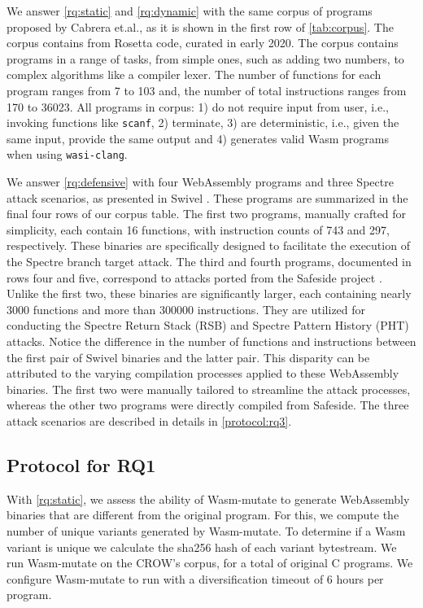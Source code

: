 \documentclass[sigplan,screen]{acmart}
\newcommand{\tool}{Wasm-mutate\xspace}
\newcommand{\wasm}{Wasm\xspace}
\newcommand{\Wasm}{WebAssembly\xspace}
\newcommand{\etal}{et.al.\xspace}
\newcommand{\ie}{i.e.,\xspace}
\begin{document}
We answer \ref{rq:static} and \ref{rq:dynamic} with the same corpus of programs proposed by Cabrera \etal \cite{arteaga2020crow}, as it is shown in the first row of \autoref{tab:corpus}.
The corpus contains \nProgramsRosetta from Rosetta code, curated in early 2020.
The corpus contains programs in a range of tasks, from simple ones, such as adding two numbers, to complex algorithms like a compiler lexer. 
The number of functions for each program ranges from 7 to 103 and, the number of total instructions ranges from 170 to 36023.
All programs in corpus: 1) do not require input from user, \ie invoking functions like \texttt{scanf}, 2) terminate, 3) are deterministic, \ie given the same input, provide the same output and 4) generates valid \wasm programs when using \texttt{wasi-clang}.

We answer \ref{rq:defensive} with four \Wasm programs and three Spectre attack scenarios, as presented in Swivel \cite{Swivel}. 
These programs are summarized in the final four rows of our corpus table.
The first two programs, manually crafted for simplicity, each contain 16 functions, with instruction counts of 743 and 297, respectively. These binaries are specifically designed to facilitate the execution of the Spectre branch target attack.
The third and fourth programs, documented in rows four and five, correspond to attacks ported from the Safeside project \cite{safeside}. 
Unlike the first two, these binaries are significantly larger, each containing nearly 3000 functions and more than 300000 instructions. 
They are utilized for conducting the Spectre Return Stack (RSB) and Spectre Pattern History (PHT) attacks.
Notice the difference in the number of functions and instructions between the first pair of Swivel binaries and the latter pair. 
This disparity can be attributed to the varying compilation processes applied to these \Wasm binaries. 
The first two were manually tailored to streamline the attack processes, whereas the other two programs were directly compiled from Safeside.
The three attack scenarios are described in details in \autoref{protocol:rq3}.

\subsection{Protocol for RQ1}


With \ref{rq:static},
we assess the ability of \tool to generate \Wasm binaries that are different from the original program.
For this, we compute the number of unique variants generated by \tool.
To determine if a \wasm variant is unique we calculate the sha256 hash of each variant bytestream.
We run \tool on the CROW's corpus, for a total of \nProgramsRosetta{} original C programs. 
We configure \tool to run with a diversification timeout of 6 hours per program. 
\end{document}
